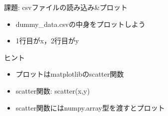 \documentclass[12pt, dvipdfmx]{beamer}
\begin{document}
\begin{frame}{課題: csvファイルの読み込み\&プロット}
    \begin{itemize}
        \item dummy\_data.csvの中身をプロットしよう
        \item 1行目がx，2行目がy
    \end{itemize}
    \begin{exampleblock}{ヒント}
        \begin{itemize}
            \item プロットはmatplotlibのscatter関数
            \item scatter関数: scatter(x,y)
            \item scatter関数にはnumpy.array型を渡すとプロット
        \end{itemize}    
    \end{exampleblock}
\end{frame}
\end{document}
